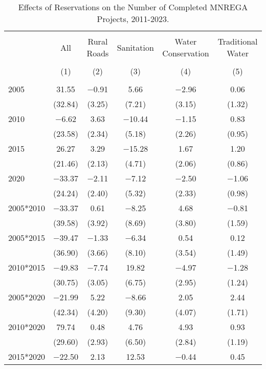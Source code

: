
\begin{table}[!htbp] \centering 
  \caption{Effects of Reservations on the Number of Completed MNREGA Projects, 2011-2023.} 
  \label{main_mnrega_2011_2023_all} 
\scriptsize 
\begin{tabular}{@{\extracolsep{5pt}}lccccc} 
\\[-1.8ex]\hline 
\hline \\[-1.8ex] 
 & All & Rural Roads & Sanitation & Water Conservation & Traditional Water \\ 
\\[-1.8ex] & (1) & (2) & (3) & (4) & (5)\\ 
\hline \\[-1.8ex] 
 2005 & 31.55 & $-$0.91 & 5.66 & $-$2.96 & 0.06 \\ 
  & (32.84) & (3.25) & (7.21) & (3.15) & (1.32) \\ 
  2010 & $-$6.62 & 3.63 & $-$10.44 & $-$1.15 & 0.83 \\ 
  & (23.58) & (2.34) & (5.18) & (2.26) & (0.95) \\ 
  2015 & 26.27 & 3.29 & $-$15.28 & 1.67 & 1.20 \\ 
  & (21.46) & (2.13) & (4.71) & (2.06) & (0.86) \\ 
  2020 & $-$33.37 & $-$2.11 & $-$7.12 & $-$2.50 & $-$1.06 \\ 
  & (24.24) & (2.40) & (5.32) & (2.33) & (0.98) \\ 
  2005*2010 & $-$33.37 & 0.61 & $-$8.25 & 4.68 & $-$0.81 \\ 
  & (39.58) & (3.92) & (8.69) & (3.80) & (1.59) \\ 
  2005*2015 & $-$39.47 & $-$1.33 & $-$6.34 & 0.54 & 0.12 \\ 
  & (36.90) & (3.66) & (8.10) & (3.54) & (1.49) \\ 
  2010*2015 & $-$49.83 & $-$7.74 & 19.82 & $-$4.97 & $-$1.28 \\ 
  & (30.75) & (3.05) & (6.75) & (2.95) & (1.24) \\ 
  2005*2020 & $-$21.99 & 5.22 & $-$8.66 & 2.05 & 2.44 \\ 
  & (42.34) & (4.20) & (9.30) & (4.07) & (1.71) \\ 
  2010*2020 & 79.74 & 0.48 & 4.76 & 4.93 & 0.93 \\ 
  & (29.60) & (2.93) & (6.50) & (2.84) & (1.19) \\ 
  2015*2020 & $-$22.50 & 2.13 & 12.53 & $-$0.44 & 0.45 \\ 

\end{tabular}
\end{table}
